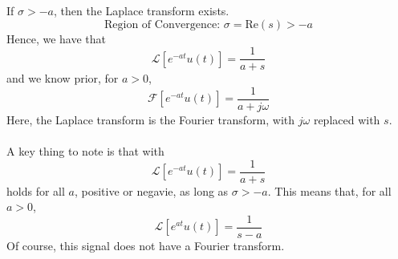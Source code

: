 \documentclass[10pt]{article}
\newcommand{\fourier}{\mathcal{F}}
\newcommand{\laplace}{\mathcal{L}}
\begin{document}
If $\sigma > -a$, then the Laplace transform exists.
\[\boxed{\text{Region of Convergence:  } \sigma = \text{Re}(s) > -a}\]
Hence, we have that
\[\laplace[e^{-at} u(t)] = \frac{1}{a + s}\]
and we know prior, for $a > 0$,
\[\fourier[e^{-at} u(t)] = \frac{1}{a + j\omega}\]
Here, the Laplace transform is the Fourier transform, with $j\omega$ replaced with $s$.\\\\
A key thing to note is that with 
\[\laplace[e^{-at} u(t)] = \frac{1}{a + s}\]
holds for all $a$, positive or negavie, as long as $\sigma > -a$.  This means that, for all $a > 0$, 
\[\laplace[e^{at} u(t)] = \frac{1}{s - a}\]
Of course, this signal does not have a Fourier transform.
\end{document}

